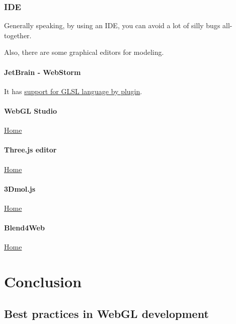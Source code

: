 \documentclass[]{article}
\begin{document}
\subsubsection{IDE}\label{ide}

Generally speaking, by using an IDE, you can avoid a lot of silly bugs
all-together.

Also, there are some graphical editors for modeling.

\paragraph{JetBrain - WebStorm}\label{jetbrain---webstorm}

It has \href{https://plugins.jetbrains.com/plugin/6993?pr=idea}{support
for GLSL language by plugin}.

\paragraph{WebGL Studio}\label{webgl-studio}

\href{http://webglstudio.org}{Home}

\paragraph{Three.js editor}\label{three.js-editor}

\href{http://threejs.org/editor/}{Home}

\paragraph{3Dmol.js}\label{dmol.js}

\href{http://3dmol.csb.pitt.edu}{Home}

\paragraph{Blend4Web}\label{blend4web}

\href{https://www.blend4web.com/en/}{Home}

\newpage
\section{Conclusion}\label{conclusion}

\subsection{Best practices in WebGL
development}\label{best-practices-in-webgl-development}
\end{document}
